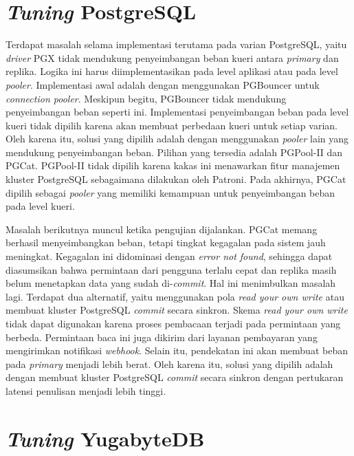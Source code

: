 \pagebreak

\section{\textit{Tuning} PostgreSQL}

Terdapat masalah selama implementasi terutama pada varian PostgreSQL, yaitu \textit{driver} PGX tidak mendukung penyeimbangan beban kueri antara \textit{primary} dan replika. Logika ini harus diimplementasikan pada level aplikasi atau pada level \textit{pooler}. Implementasi awal adalah dengan menggunakan PGBouncer untuk \textit{connection pooler}. Meskipun begitu, PGBouncer tidak mendukung penyeimbangan beban seperti ini. Implementasi penyeimbangan beban pada level kueri tidak dipilih karena akan membuat perbedaan kueri untuk setiap varian. Oleh karena itu, solusi yang dipilih adalah dengan menggunakan \textit{pooler} lain yang mendukung penyeimbangan beban. Pilihan yang tersedia adalah PGPool-II dan PGCat. PGPool-II tidak dipilih karena kakas ini menawarkan fitur manajemen kluster PostgreSQL sebagaimana dilakukan oleh Patroni. Pada akhirnya, PGCat dipilih sebagai \textit{pooler} yang memiliki kemampuan untuk penyeimbangan beban pada level kueri.

Masalah berikutnya muncul ketika pengujian dijalankan. PGCat memang berhasil menyeimbangkan beban, tetapi tingkat kegagalan pada sistem jauh meningkat. Kegagalan ini didominasi dengan \textit{error not found}, sehingga dapat diasumsikan bahwa permintaan dari pengguna terlalu cepat dan replika masih belum menetapkan data yang sudah di-\textit{commit}. Hal ini menimbulkan masalah lagi. Terdapat dua alternatif, yaitu menggunakan pola \textit{read your own write} atau membuat kluster PostgreSQL \textit{commit} secara sinkron. Skema \textit{read your own write} tidak dapat digunakan karena proses pembacaan terjadi pada permintaan yang berbeda. Permintaan baca ini juga dikirim dari layanan pembayaran yang mengirimkan notifikasi \textit{webhook}. Selain itu, pendekatan ini akan membuat beban pada \textit{primary} menjadi lebih berat. Oleh karena itu, solusi yang dipilih adalah dengan membuat kluster PostgreSQL \textit{commit} secara sinkron dengan pertukaran latensi penulisan menjadi lebih tinggi.

\pagebreak

\section{\textit{Tuning} YugabyteDB}

